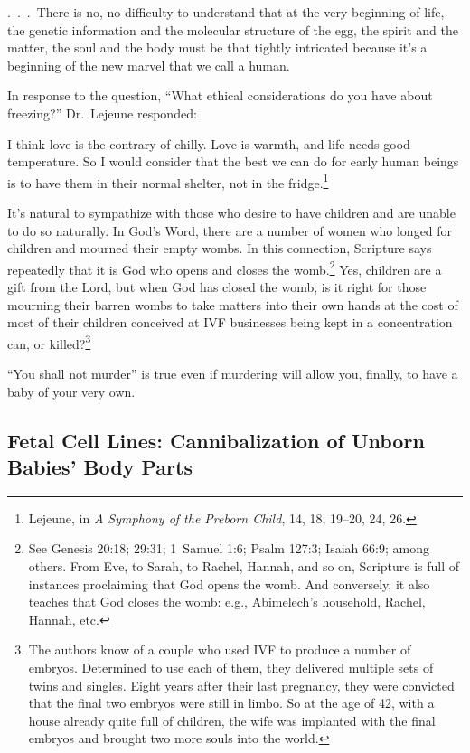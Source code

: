 \documentclass[
]{book}
\begin{document}
.~.~.~There is no, no difficulty to understand that at the very beginning of life, the genetic information and the molecular structure of the egg, the spirit and the matter, the soul and the body must be that tightly intricated because it's a beginning of the new marvel that we call a human.

In response to the question, ``What ethical considerations do you have about freezing?'' Dr.~Lejeune responded:

I think love is the contrary of chilly. Love is warmth, and life needs good temperature. So I would consider that the best we can do for early human beings is to have them in their normal shelter, not in the fridge.\footnote{Lejeune, in \emph{A Symphony of the Preborn Child}, 14, 18, 19--20, 24, 26.}

It's natural to sympathize with those who desire to have children and are unable to do so naturally. In God's Word, there are a number of women who longed for children and mourned their empty wombs. In this connection, Scripture says repeatedly that it is God who opens and closes the womb.\footnote{See Genesis 20:18; 29:31; 1~Samuel 1:6; Psalm 127:3; Isaiah 66:9; among others. From Eve, to Sarah, to Rachel, Hannah, and so on, Scripture is full of instances proclaiming that God opens the womb. And conversely, it also teaches that God closes the womb: e.g., Abimelech's household, Rachel, Hannah, etc.} Yes, children are a gift from the Lord, but when God has closed the womb, is it right for those mourning their barren wombs to take matters into their own hands at the cost of most of their children conceived at IVF businesses being kept in a concentration can, or killed?\footnote{The authors know of a couple who used IVF to produce a number of embryos. Determined to use each of them, they delivered multiple sets of twins and singles. Eight years after their last pregnancy, they were convicted that the final two embryos were still in limbo. So at the age of 42, with a house already quite full of children, the wife was implanted with the final embryos and brought two more souls into the world.}

``You shall not murder'' is true even if murdering will allow you, finally, to have a baby of your very own.

\hypertarget{fetal-cell-lines-cannibalization-of-unborn-babies-body-parts}{%
\subsection{Fetal Cell Lines: Cannibalization of Unborn Babies' Body Parts}\label{fetal-cell-lines-cannibalization-of-unborn-babies-body-parts}}
\end{document}
